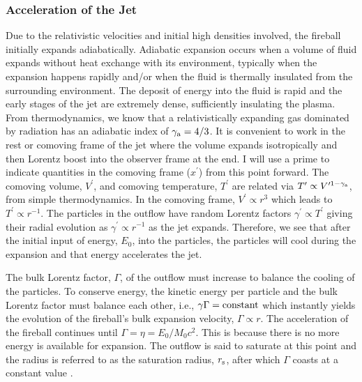 \subsubsection{Acceleration of the Jet}
\label{sec:eoj}
Due to the relativistic velocities and initial high densities
involved, the fireball initially expands adiabatically. Adiabatic
expansion occurs when a volume of fluid expands without heat exchange
with its environment, typically when the expansion happens rapidly
and/or when the fluid is thermally insulated from the surrounding
environment. The deposit of energy into the fluid is rapid and the
early stages of the jet are extremely dense, sufficiently insulating
the plasma. From thermodynamics, we know that a relativistically
expanding gas dominated by radiation has an adiabatic index of
$\gamma_{\rm a}=4/3$. It is convenient to work in the rest or comoving
frame of the jet where the volume expands isotropically and then
Lorentz boost into the observer frame at the end. I will use a prime
to indicate quantities in the comoving frame ($x^{\prime}$) from this
point forward. The comoving volume, $V^{\prime}$, and comoving
temperature, $T^{\prime}$ are related via $T^{\prime} \propto
V^{\prime 1-\gamma_{\rm a}}$, from simple thermodynamics. In the
comoving frame, $V^{\prime} \propto r^3$ \cite{Meszaros:1993} which
leads to $T^{\prime} \propto r^{-1}$. The particles in the outflow
have random Lorentz factors $\gamma^{\prime} \propto T^{\prime}$
giving their radial evolution as $\gamma^{\prime} \propto r^{-1}$ as
the jet expands. Therefore, we see that after the initial input of
energy, $E_0$, into the particles, the particles will cool during the
expansion and that energy accelerates the jet.

The bulk Lorentz factor, $\Gamma$, of the outflow must increase to
balance the cooling of the particles. To conserve energy, the kinetic
energy per particle and the bulk Lorentz factor must balance each
other, i.e.,  $\gamma\Gamma = {\rm constant}$ which instantly yields the
evolution of the fireball's bulk expansion velocity, $\Gamma \propto
r$. The acceleration of the fireball continues until $\Gamma = \eta =
E_0/{M_0 c^2}$. This is because there is no more energy is available
for expansion. The
outflow is said to saturate at this point and the radius is referred
to as the saturation radius, $r_{\rm s}$, after which $\Gamma$ coasts
at a constant value \cite{Paczynski:1986,Goodman:1986,Shemi:1990}.


